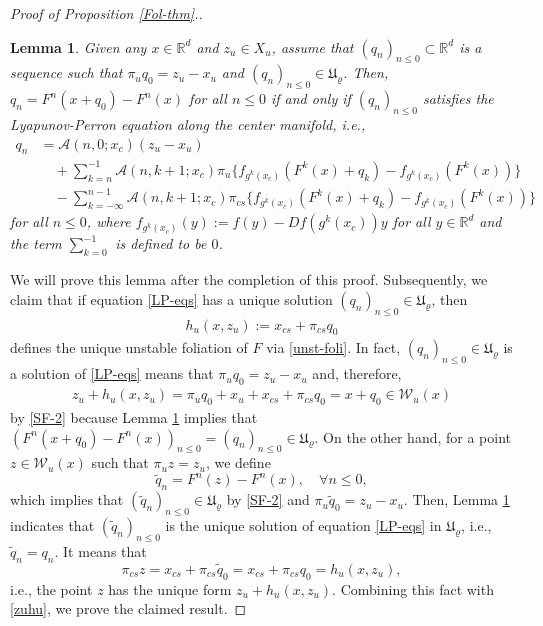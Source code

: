 \documentclass[reqno]{amsart}
\numberwithin{equation}{section}
\newtheorem{lemma}[theorem]{Lemma}
\begin{document}
\begin{proof}[Proof of Proposition {\rm \ref{Fol-thm}.}]
\begin{lemma}\label{lm-LPeq}
Given any $x\in\mathbb{R}^d$ and $z_u\in X_u$, assume that $(q_n)_{n\le 0}\subset \mathbb{R}^d$ is a sequence such that $\pi_u q_0=z_u-x_u$ and
$(q_n)_{n\le 0}\in \mathfrak{U}_{\varrho}$. Then, $q_n=F^n(x+q_0)- F^n(x)$ for all $n\le 0$
if and only if $(q_n)_{n\le 0}$ satisfies the Lyapunov-Perron equation along the center manifold, i.e.,   %
\begin{align}\label{LP-eqs}
q_n  &= \mathcal{A}(n,0;x_c) (z_u-x_u)
\nonumber\\
&\quad+\sum_{k=n}^{-1} \mathcal{A}(n,k+1;x_c)\pi_u \{f_{g^k(x_c)}(F^k(x)+q_k)-f_{g^k(x_c)}(F^k(x)) \}
\nonumber\\
&\quad-\sum_{k=-\infty}^{n-1}  \mathcal{A}(n,k+1;x_c) \pi_{cs} \{f_{g^k(x_c)}(F^k(x)+q_k)-f_{g^k(x_c)}(F^k(x)) \}
\end{align}
for all $n\le 0$,
where $f_{g^k(x_c)}(y):=f(y)-Df(g^k(x_c))y$ for all $y\in\mathbb{R}^d$ and the term
$
\sum_{k=0}^{-1}
$
is defined to be $0$.
\end{lemma}
We will prove this lemma after the completion of this proof.
Subsequently, we claim that if equation \eqref{LP-eqs} has a unique solution $(q_n)_{n\le 0}\in \mathfrak{U}_{\varrho}$, then
\begin{align}\label{hh-qq}
h_u(x,z_u):=x_{cs}+\pi_{cs}q_0
\end{align}
defines the unique unstable foliation of $F$ via \eqref{unst-foli}. In fact, $(q_n)_{n\le 0}\in \mathfrak{U}_{\varrho}$ is a solution of \eqref{LP-eqs} means that $\pi_u q_0=z_u-x_u$ and, therefore,
\begin{align}\label{zuhu}
z_u+h_u(x,z_u)=\pi_uq_0+x_u+x_{cs}+\pi_{cs}q_0=x+q_0
\in \mathcal{W}_u(x)
\end{align}
by \eqref{SF-2} because Lemma \ref{lm-LPeq} implies that
$
(F^n(x+q_0)- F^n(x))_{n\le 0}=(q_n)_{n\le 0}\in \mathfrak{U}_{\varrho}.
$
On the other hand, for a point $z\in \mathcal{W}_u(x)$ such that $\pi_u z=z_u$, we define
$$
\tilde q_n=F^n(z)- F^n(x),\quad \forall n\le 0,
$$
which implies that $(\tilde q_n)_{n\le 0}\in \mathfrak{U}_{\varrho}$ by \eqref{SF-2} and $\pi_u\tilde q_0=z_u-x_u$. Then, Lemma \ref{lm-LPeq} indicates that $(\tilde q_n)_{n\le 0}$ is the unique solution of equation \eqref{LP-eqs} in $\mathfrak{U}_{\varrho}$, i.e., $\tilde q_n=q_n$. It means that
$$
\pi_{cs}z=x_{cs}+\pi_{cs}\tilde q_0=x_{cs}+\pi_{cs}q_0=h_u(x,z_u),
$$
i.e., the point $z$ has the unique form $z_u+h_u(x,z_u)$. Combining this fact with \eqref{zuhu}, we prove the claimed result.


\end{proof}
\end{document}
